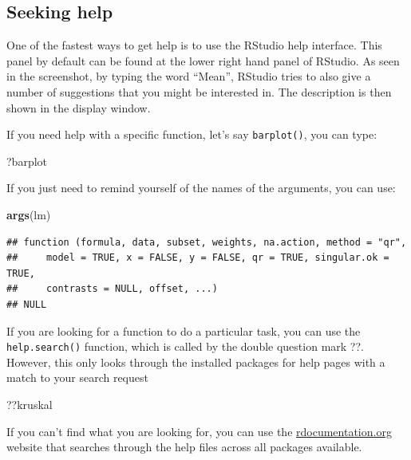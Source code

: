 \documentclass[
]{book}
\newenvironment{Shaded}{\begin{snugshade}}{\end{snugshade}}
\newcommand{\FunctionTok}[1]{\textcolor[rgb]{0.13,0.29,0.53}{\textbf{#1}}}
\newcommand{\NormalTok}[1]{#1}
\begin{document}
\subsection*{Seeking help}\label{seeking-help}

One of the fastest ways to get help is to use the RStudio help interface. This panel by default can be found at the lower right hand panel of RStudio. As seen in the screenshot, by typing the word ``Mean'', RStudio tries to also give a number of suggestions that you might be interested in. The description is then shown in the display window.

If you need help with a specific function, let's say \texttt{barplot()}, you can type:

\begin{Shaded}
\begin{Highlighting}[]
\NormalTok{?barplot}
\end{Highlighting}
\end{Shaded}

If you just need to remind yourself of the names of the arguments, you can use:

\begin{Shaded}
\begin{Highlighting}[]
\FunctionTok{args}\NormalTok{(lm)}
\end{Highlighting}
\end{Shaded}

\begin{verbatim}
## function (formula, data, subset, weights, na.action, method = "qr", 
##     model = TRUE, x = FALSE, y = FALSE, qr = TRUE, singular.ok = TRUE, 
##     contrasts = NULL, offset, ...) 
## NULL
\end{verbatim}

If you are looking for a function to do a particular task, you can use the \texttt{help.search()} function, which is called by the double question mark ??. However, this only looks through the installed packages for help pages with a match to your search request

\begin{Shaded}
\begin{Highlighting}[]
\NormalTok{??kruskal}
\end{Highlighting}
\end{Shaded}

If you can't find what you are looking for, you can use the \href{https://www.rdocumentation.org}{rdocumentation.org} website that searches through the help files across all packages available.
\end{document}
